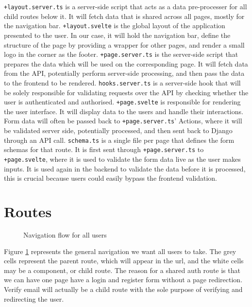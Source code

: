 \texttt{+layout.server.ts} is a server-side script that acts as a data pre-processer for all child routes below it. It will fetch data that is shared across all pages, mostly for the navigation bar. \texttt{+layout.svelte} is the global layout of the application presented to the user. In our case, it will hold the navigation bar, define the structure of the page by providing a wrapper for other pages, and render a small logo in the corner as the footer. \texttt{+page.server.ts} is the server-side script that prepares the data which will be used on the corresponding page. It will fetch data from the API, potentially perform server-side processing, and then pass the data to the frontend to be rendered. \texttt{hooks.server.ts} is a server-side hook that will be solely responsible for validating requests over the API by checking whether the user is authenticated and authorised. \texttt{+page.svelte} is responsible for rendering the user interface. It will display data to the users and handle their interactions. Form data will often be passed back to \texttt{+page.server.ts}' Actions, where it will be validated server side, potentially processed, and then sent back to Django through an API call. \texttt{schema.ts} is a single file per page that defines the form schemas for that route. It is first sent through \texttt{+page.server.ts} to \texttt{+page.svelte}, where it is used to validate the form data live as the user makes inputs. It is used again in the backend to validate the data before it is processed, this is crucial because users could easily bypass the frontend validation.

\section{Routes} \label{Routes}

\begin{figure}[H]
\centering
{}
\vspace{-5pt}
\caption{Navigation flow for all users}
\label{fig:ui-all}
\vspace{-20pt}
\end{figure}
Figure \ref{fig:ui-all} represents the general navigation we want all users to take. The grey cells represent the parent route, which will appear in the url, and the white cells may be a component, or child route. The reason for a shared auth route is that we can have one page have a login and register form without a page redirection. Verify email will actually be a child route with the sole purpose of verifying and redirecting the user. 

